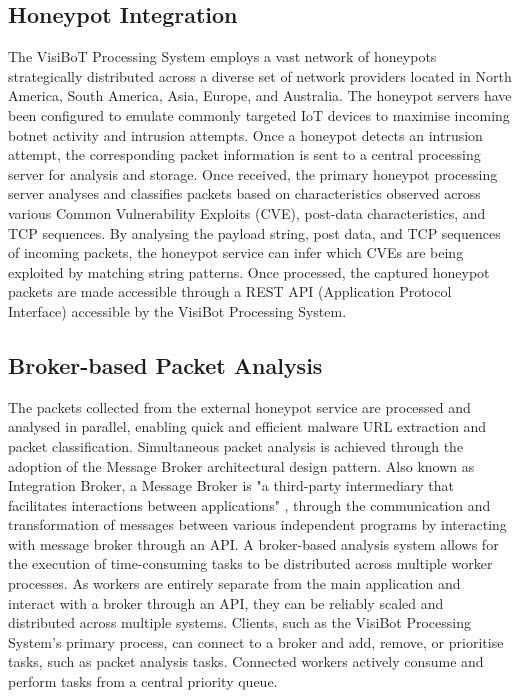 \subsection{Honeypot Integration}

The VisiBoT Processing System employs a vast network of honeypots strategically distributed across a diverse set of network providers located in North America, South America, Asia, Europe, and Australia. The honeypot servers have been configured to emulate commonly targeted IoT devices to maximise incoming botnet activity and intrusion attempts. Once a honeypot detects an intrusion attempt, the corresponding packet information is sent to a central processing server for analysis and storage. Once received, the primary honeypot processing server analyses and classifies packets based on characteristics observed across various Common Vulnerability Exploits (CVE), post-data characteristics, and TCP sequences. By analysing the payload string, post data, and TCP sequences of incoming packets, the honeypot service can infer which CVEs are being exploited by matching string patterns. Once processed, the captured honeypot packets are made accessible through a REST API (Application Protocol Interface) accessible by the VisiBot Processing System.

\subsection{Broker-based Packet Analysis}

The packets collected from the external honeypot service are processed and analysed in parallel, enabling quick and efficient malware URL extraction and packet classification. Simultaneous packet analysis is achieved through the adoption of the Message Broker architectural design pattern. Also known as Integration Broker, a Message Broker is "a third-party intermediary that facilitates interactions between applications" \citep{IBDefinition}, through the communication and transformation of messages between various independent programs by interacting with message broker through an API. A broker-based analysis system allows for the execution of time-consuming tasks to be distributed across multiple worker processes. As workers are entirely separate from the main application and interact with a broker through an API, they can be reliably scaled and distributed across multiple systems. Clients, such as the VisiBot Processing System's primary process, can connect to a broker and add, remove, or prioritise tasks, such as packet analysis tasks. Connected workers actively consume and perform tasks from a central priority queue. 

